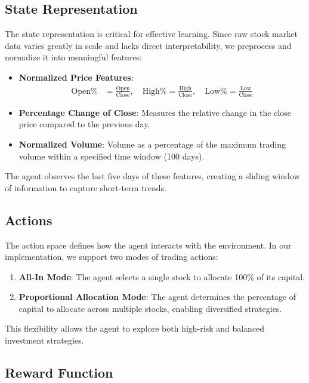 \documentclass[conference]{IEEEtran}
\begin{document}
\subsection{State Representation}

The state representation is critical for effective learning. Since raw stock market data varies greatly in scale and lacks direct interpretability, we preprocess and normalize it into meaningful features:

\begin{itemize}
    \item \textbf{Normalized Price Features}:
    \begin{align*}
    \text{Open\%} &= \frac{\text{Open}}{\text{Close}}, \quad \text{High\%} = \frac{\text{High}}{\text{Close}}, \quad \text{Low\%} = \frac{\text{Low}}{\text{Close}}
    \end{align*}
    \item \textbf{Percentage Change of Close}: Measures the relative change in the close price compared to the previous day.
    \item \textbf{Normalized Volume}: Volume as a percentage of the maximum trading volume within a specified time window (100 days).
\end{itemize}

The agent observes the last five days of these features, creating a sliding window of information to capture short-term trends.

\subsection{Actions}

The action space defines how the agent interacts with the environment. In our implementation, we support two modes of trading actions:

\begin{enumerate}
    \item \textbf{All-In Mode}: The agent selects a single stock to allocate 100\% of its capital.
    \item \textbf{Proportional Allocation Mode}: The agent determines the percentage of capital to allocate across multiple stocks, enabling diversified strategies.
\end{enumerate}

This flexibility allows the agent to explore both high-risk and balanced investment strategies.

\subsection{Reward Function}
\end{document}

